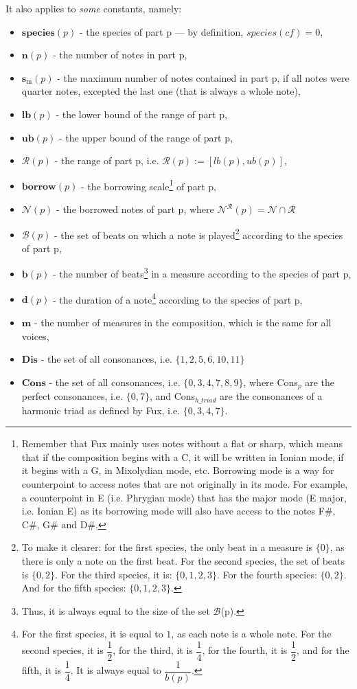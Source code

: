 \noindent It also applies to \textit{some} constants, namely:
\begin{itemize}
    \item $\textbf{species}(p)$ - the species of part p --- by definition, $species(\mathit{cf}) = 0$,
    \item $\textbf{n}(p)$ - the number of notes in part p,
    \item $\textbf{s$_\text{m}$}(p)$ - the maximum number of notes contained in part p, if all notes were quarter notes, excepted the last one (that is always a whole note),
    \item $\textbf{lb}(p)$ - the lower bound of the range of part p,
    \item $\textbf{ub}(p)$ - the upper bound of the range of part p,
    \item $\mathcal{R}(p)$ - the range of part p, i.e. $\mathcal{R}(p) := [lb(p), ub(p)]$,
    \item $\textbf{borrow}(p)$ - the borrowing scale\footnote{Remember that Fux mainly uses notes without a flat or sharp, which means that if the composition begins with a C, it will be written in Ionian mode, if it begins with a G, in Mixolydian mode, etc. Borrowing mode is a way for counterpoint to access notes that are not originally in its mode. For example, a counterpoint in E (i.e. Phrygian mode) that has the major mode (E major, i.e. Ionian E) as its borrowing mode will also have access to the notes F\#, C\#, G\# and D\#.} of part p,
    \item $\mathcal{N}(p)$ - the borrowed notes of part p, where $\mathcal{N}^{\mathcal{R}}(p) = \mathcal{N} \cap \mathcal{R}$
    \item $\mathcal{B}(p)$ - the set of beats on which a note is played\footnote{To make it clearer: for the first species, the only beat in a measure is $\{0\}$, as there is only a note on the first beat. For the second species, the set of beats is $\{0, 2\}$. For the third species, it is: $\{0, 1, 2, 3\}$. For the fourth species: $\{0, 2\}$. And for the fifth species: $\{0, 1, 2, 3\}$.} according to the species of part p,
    \item $\textbf{b}(p)$ - the number of beats\footnote{Thus, it is always equal to the size of the set $\mathcal{B}$(p).} in a measure according to the species of part p,
    \item $\textbf{d}(p)$ - the duration of a note\footnote{For the first species, it is equal to $1$, as each note is a whole note. For the second species, it is $\dfrac{1}{2}$, for the third, it is $\dfrac{1}{4}$, for the fourth, it is $\dfrac{1}{2}$, and for the fifth, it is $\dfrac{1}{4}$. It is always equal to $\dfrac{1}{b(p)}$.} according to the species of part p,
    \item $\textbf{m}$ - the number of measures in the composition, which is the same for all voices,
    \item $\textbf{Dis}$ - the set of all consonances, i.e. $\{1, 2,5, 6, 10, 11\}$
    \item $\textbf{Cons}$ - the set of all consonances, i.e. $\{0, 3, 4, 7, 8, 9\}$, where Cons$_p$ are the perfect consonances, i.e. $\{0, 7\}$, and Cons$_{h\_triad}$ are the consonances of a harmonic triad as defined by Fux, i.e. $\{0, 3, 4, 7\}$.
\end{itemize}
